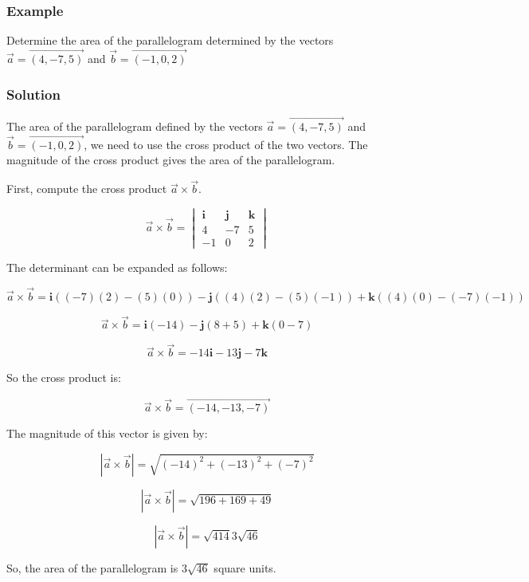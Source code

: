 \documentclass{article}
\begin{document}
\subsubsection*{Example}
 Determine the area of the parallelogram determined by the vectors $\vec{a}=\overrightarrow{(4,-7,5)}$ and $\vec{b}=\overrightarrow{(-1,0,2)}$
 \subsubsection*{Solution}
The area of the parallelogram defined by the vectors $\vec{a} = \overrightarrow{(4, -7, 5)}$ and $\vec{b} = \overrightarrow{(-1, 0, 2)}$, we need to use the cross product of the two vectors. The magnitude of the cross product gives the area of the parallelogram.

First, compute the cross product $\vec{a} \times \vec{b}$.

\[
\vec{a} \times \vec{b} = \begin{vmatrix}
\mathbf{i} & \mathbf{j} & \mathbf{k} \\
4 & -7 & 5 \\
-1 & 0 & 2
\end{vmatrix}
\]

The determinant can be expanded as follows:

\[
\vec{a} \times \vec{b} = \mathbf{i} \left((-7)(2) - (5)(0)\right) - \mathbf{j} \left((4)(2) - (5)(-1)\right) + \mathbf{k} \left((4)(0) - (-7)(-1)\right)
\]

\[
\vec{a} \times \vec{b} = \mathbf{i} (-14) - \mathbf{j} (8 + 5) + \mathbf{k} (0 - 7)
\]

\[
\vec{a} \times \vec{b} = -14\mathbf{i} - 13\mathbf{j} - 7\mathbf{k}
\]

So the cross product is:

\[
\vec{a} \times \vec{b} = \overrightarrow{(-14, -13, -7)}
\]

The magnitude of this vector is given by:

\[
|\vec{a} \times \vec{b}| = \sqrt{(-14)^2 + (-13)^2 + (-7)^2}
\]

\[
|\vec{a} \times \vec{b}| = \sqrt{196 + 169 + 49}
\]

\[
|\vec{a} \times \vec{b}| = \sqrt{414} 3\sqrt{46}
\]

So, the area of the parallelogram is $3\sqrt{46}$ square units.
\end{document}
